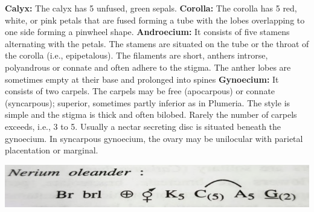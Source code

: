 \documentclass{article}
\begin{document}
\text{ }\newline
\textbf{Calyx:} The calyx has 5 unfused, green sepals.\newline
\textbf{Corolla:} The corolla has 5 red, white, or pink petals that are fused forming a tube with the lobes overlapping to one side forming a pinwheel shape.\newline
\textbf{Androecium:} It consists of five stamens alternating with
the petals. The stamens are situated on the tube or the
throat of the corolla (i.e., epipetalous). The filaments are
short, anthers introrse, polyandrous or connate and often
adhere to the stigma. The anther lobes are sometimes
empty at their base and prolonged into spines\newline
\textbf{Gynoecium:} It consists of two carpels. The carpels may be
free (apocarpous) or connate (syncarpous); superior,
sometimes partly inferior as in Plumeria. The style is
simple and the stigma is thick and often bilobed. Rarely
the number of carpels exceeds, i.e., 3 to 5. Usually a
nectar secreting disc is situated beneath the gynoecium.
In syncarpous gynoecium, the ovary may be unilocular
with parietal placentation or marginal.
\begin{center}
    \includegraphics{images/Screenshot 2023-06-21 235234.png}
\end{center}
\end{document}
